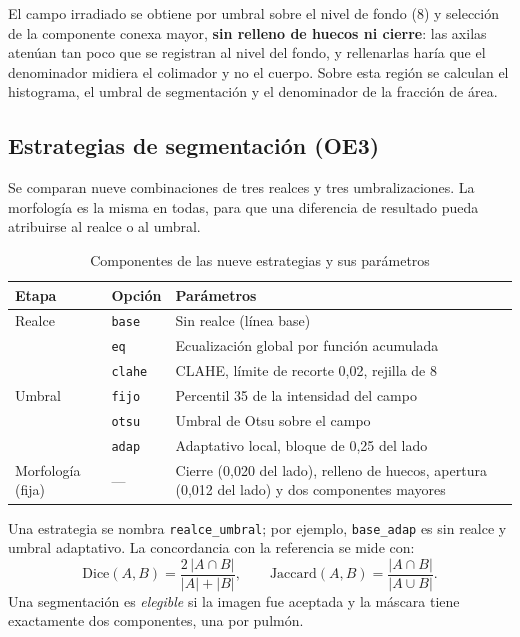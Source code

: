 El campo irradiado se obtiene por umbral sobre el nivel de fondo (8) y selección de
la componente conexa mayor, \textbf{sin relleno de huecos ni cierre}: las axilas
atenúan tan poco que se registran al nivel del fondo, y rellenarlas haría que el
denominador midiera el colimador y no el cuerpo. Sobre esta región se calculan el
histograma, el umbral de segmentación y el denominador de la fracción de área.


\subsection{Estrategias de segmentación (OE3)}
\label{sec:met-oe3}

Se comparan nueve combinaciones de tres realces y tres umbralizaciones. La
morfología es la misma en todas, para que una diferencia de resultado pueda
atribuirse al realce o al umbral.

\begin{table}[H]
\centering
\small
\caption{Componentes de las nueve estrategias y sus parámetros}
\begin{tabular}{@{}p{3.4cm}p{3.6cm}p{6.6cm}@{}}
\toprule
\textbf{Etapa} & \textbf{Opción} & \textbf{Parámetros} \\
\midrule
Realce & \texttt{base} & Sin realce (línea base) \\
       & \texttt{eq} & Ecualización global por función acumulada \\
       & \texttt{clahe} & CLAHE, límite de recorte 0,02, rejilla de 8 \\
\addlinespace
Umbral & \texttt{fijo} & Percentil 35 de la intensidad del campo \\
       & \texttt{otsu} & Umbral de Otsu sobre el campo \\
       & \texttt{adap} & Adaptativo local, bloque de 0,25 del lado \\
\addlinespace
Morfología (fija) & --- & Cierre (0,020 del lado), relleno de huecos, apertura
(0,012 del lado) y dos componentes mayores \\
\bottomrule
\end{tabular}
\end{table}

Una estrategia se nombra \texttt{realce\_umbral}; por ejemplo, \texttt{base\_adap}
es sin realce y umbral adaptativo. La concordancia con la referencia se mide con:
\begin{equation}
\mathrm{Dice}(A,B) = \frac{2\,|A \cap B|}{|A| + |B|}, \qquad
\mathrm{Jaccard}(A,B) = \frac{|A \cap B|}{|A \cup B|}.
\end{equation}
Una segmentación es \emph{elegible} si la imagen fue aceptada y la máscara tiene
exactamente dos componentes, una por pulmón.

